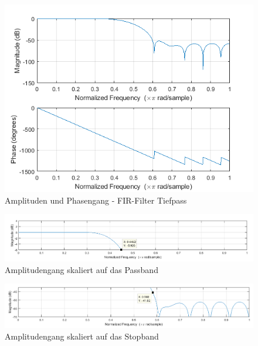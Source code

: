 


\begin{figure}[H]
\centering
\includegraphics[width=1.0\linewidth]{Bilder/Attachment_A1_fir_2a_Amplitudengang}
\caption{Amplituden und Phasengang - FIR-Filter Tiefpass}
\label{fig:Attachment_A1_fir_2a_Amplitudengang}
\end{figure}


\begin{figure}[H]
\centering
\includegraphics[width=1.0\linewidth]{Bilder/Attachment_A1_fir_2a_Amplitudengang_PassBand}
\caption{Amplitudengang skaliert auf das Passband}
\label{fig:Attachment_A1_fir_2a_Amplitudengang_PassBand}
\end{figure}

\begin{figure}[H]
\centering
\includegraphics[width=1.0\linewidth]{Bilder/Attachment_A1_fir_2a_Amplitudengang_StopBand}
\caption{Amplitudengang skaliert auf das Stopband}
\label{fig:Attachment_A1_fir_2a_Amplitudengang_StopBand}
\end{figure}


